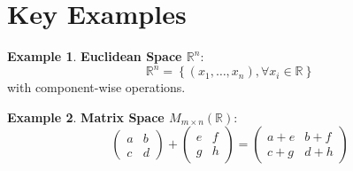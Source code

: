 \documentclass{article}
\theoremstyle{plain}
\theoremstyle{definition}
\newtheorem{example}{Example}[section]
\theoremstyle{remark}
\newcommand{\thmheader}[1]{%
  \textcolor{#1}{\normalfont\bfseries}%
}
\begin{document}
\section{Key Examples}
\begin{example}
\thmheader{excolor}\textbf{Euclidean Space $\mathbb{R}^n$}:
\[
\mathbb{R}^n = \left\{ (x_1, \hdots, x_n), \forall x_i \in \mathbb{R} \right\}
\]
with component-wise operations.
\end{example}

\begin{example}
\thmheader{excolor}\textbf{Matrix Space $M_{m \times n}(\mathbb{R})$}:
\[
\begin{pmatrix} a & b \\ c & d \end{pmatrix} + \begin{pmatrix} e & f \\ g & h \end{pmatrix} = \begin{pmatrix} a+e & b+f \\ c+g & d+h \end{pmatrix}
\]
\end{example}
\end{document}
